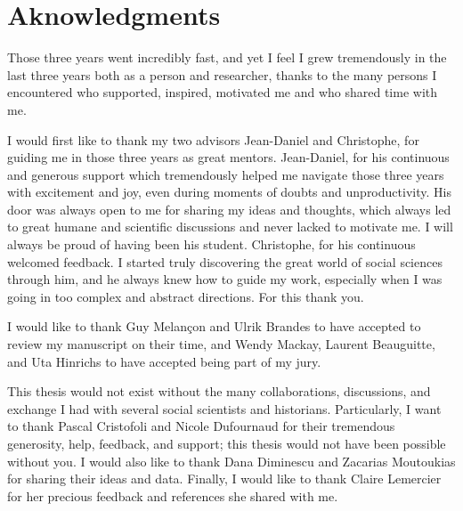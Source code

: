 \chapter*{Aknowledgments}

Those three years went incredibly fast, and yet I feel I grew tremendously in the last three years both as a person and researcher, thanks to the many persons I encountered who supported, inspired, motivated me and who shared time with me.


I would first like to thank my two advisors Jean-Daniel and Christophe, for guiding me in those three years as great mentors.
Jean-Daniel, for his continuous and generous support which tremendously helped me navigate those three years with excitement and joy, even during moments of doubts and unproductivity.
His door was always open to me for sharing my ideas and thoughts, which always led to great humane and scientific discussions and never lacked to motivate me.
I will always be proud of having been his student.
Christophe, for his continuous welcomed feedback.
I started truly discovering the great world of social sciences through him, and he always knew how to guide my work, especially when I was going in too complex and abstract directions. For this thank you.


I would like to thank Guy Melançon and Ulrik Brandes to have accepted to review my manuscript on their time, and Wendy Mackay, Laurent Beauguitte, and Uta Hinrichs to have accepted being part of my jury.


This thesis would not exist without the many collaborations, discussions, and exchange I had with several social scientists and historians.
Particularly, I want to thank Pascal Cristofoli and Nicole Dufournaud for their tremendous generosity, help, feedback, and support; this thesis would not have been possible without you.
I would also like to thank Dana Diminescu and Zacarias Moutoukias for sharing their ideas and data.
Finally, I would like to thank Claire Lemercier for her precious feedback and references she shared with me.


